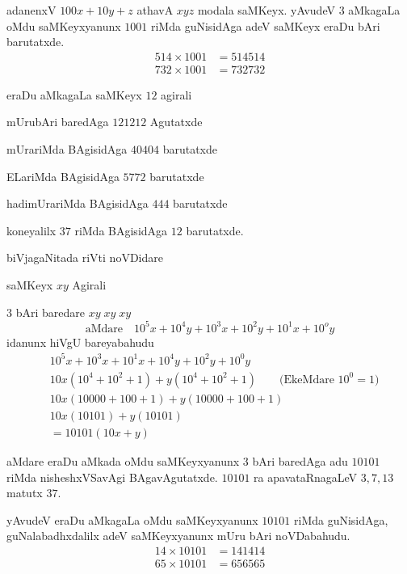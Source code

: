 adanenxV $100x+10y+z$ athavA $xyz$ modala saMKeyx. yAvudeV $3$ aMkagaLa oMdu saMKeyxyanunx $1001$ riMda guNisidAga adeV saMKeyx eraDu bAri barutatxde.
\begin{align*}
514\times 1001 &= 514514\\
732\times 1001 &= 732732
\end{align*}


eraDu aMkagaLa saMKeyx $12$ agirali

mUrubAri baredAga $121212$ Agutatxde

mUrariMda BAgisidAga $40404$ barutatxde

ELariMda BAgisidAga $5772$ barutatxde

hadimUrariMda BAgisidAga $444$ barutatxde

koneyalilx $37$ riMda BAgisidAga $12$ barutatxde.

biVjagaNitada riVti noVDidare

saMKeyx $xy$ Agirali

$3$ bAri baredare $xy\;xy\;xy$
$$
\text{aMdare}\quad 10^{5}x+10^{4}y+10^{3}x+10^{2}y+10^{1}x+10^{o}y 
$$
idanunx hiVgU bareyabahudu
\begin{align*}
&10^{5}x+10^{3}x+10^{1}x +10^{4}y+10^{2}y+10^{0}y\\
&10x\left(10^4 +10^2+1\right) +y\left(10^4+10^2+1\right)\qquad \text{(EkeMdare $10^0 = 1$)}\\
&10x(10000+100+1) + y (10000+100+1)\\
&10x(10101) + y(10101)\\
&=10101 (10x+y)
\end{align*}

aMdare eraDu aMkada oMdu saMKeyxyanunx $3$ bAri baredAga adu $10101$ riMda nisheshxVSavAgi BAgavAgutatxde. $10101$ ra apavataRnagaLeV $3,7,13$ matutx $37$.

yAvudeV eraDu aMkagaLa oMdu saMKeyxyanunx $10101$ riMda guNisidAga, guNa\-labadhxdalilx adeV saMKeyxyanunx mUru bAri noVDabahudu.
\begin{align*}
14\times 10101 &= 141414\\
65\times 10101 &= 656565
 \end{align*} 


